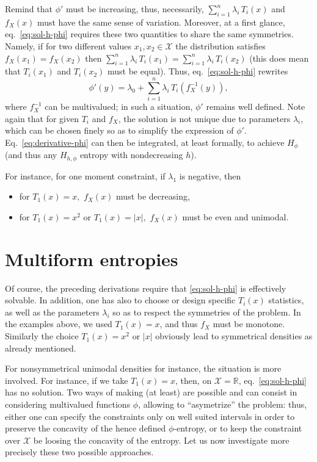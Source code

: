\documentclass[english,onecolumn]{elsarticle}
\def\Rset{\mathbb{R}}
\def\X{\mathcal{X}}
\begin{document}
Remind  that  $\phi'$  must  be increasing,  thus,  necessarily,  $\displaystyle
\sum_{i=1}^n  \lambda_i \,  T_i(x)$ and  $f_X(x)$ must  have the  same  sense of
variation.  Moreover, at a first glance, eq.~\eqref{eq:sol-h-phi} requires these
two  quantities to  share the  same symmetries.   Namely, if  for  two different
values $x_1, x_2  \in \X$ the distribution satisfies  $f_X(x_1) = f_X(x_2)$ then
$\displaystyle \sum_{i=1}^n  \lambda_i \,  T_i(x_1) = \sum_{i=1}^n  \lambda_i \,
T_i(x_2)$ (this does  mean that $T_i(x_1)$ and $T_i(x_2)$  must be equal). Thus,
eq.~\eqref{eq:sol-h-phi} rewrites
%
\begin{equation}
\phi'(y) = \lambda_0 + \sum_{i=1}^n \lambda_i \, T_i \! \left( f_X^{-1}(y)
\right),
\label{eq:derivative-phi}
\end{equation}
%
where $f_X^{-1}$ can  be multivalued; in such a  situation, $\phi'$ remains well
defined. Note again  that for given $T_i$ and $f_X$, the  solution is not unique
due to parameters $\lambda_i$, which can  be chosen finely so as to simplify the
expression of $\phi'$. Eq.~\eqref{eq:derivative-phi}  can then be integrated, at
least  formally, to  achieve $H_\phi$  (and  thus any  $H_{h,\phi}$ entropy  with
nondecreasing $h$).

For instance, for one moment constraint, if $\lambda_1$ is negative, then
%
\begin{itemize}
\item for $T_1(x) = x,$ $f_X(x)$ must be decreasing,
\item for $T_1(x) = x^2$ or $T_1(x) = |x|,$ $f_X(x)$ must be even and unimodal.
\end{itemize}



\section{Multiform entropies}
\label{sec:MultiformEnt}

Of  course,  the preceding  derivations  require  that \eqref{eq:sol-h-phi}  is
effectively solvable.   In addition, one has  also to choose  or design specific
$T_i(x)$ statistics, as well as the  parameters $\lambda_i$ so as to respect the
symmetries of  the problem.  In  the examples above,  we used $T_1(x) =  x$, and
thus $f_X$  must be  monotone.  Similarly  the choice $T_1(x)  = x^2$  or $|x|$
obviously lead to symmetrical densities as already mentioned.

For  nonsymmetrical  unimodal densities  for  instance,  the  situation is  more
involved.   For instance,  if  we take  $T_1(x) =  x$,  then, on  $\X =  \Rset$,
eq.~\eqref{eq:sol-h-phi} has  no solution.   Two ways of  making (at  least) are
possible and  can consist in considering multivalued  functions $\phi$, allowing
to ``asymetrize'' the problem: thus, either one can specify the constraints only
on well suited intervals in order to preserve the concavity of the hence defined
$\phi$-entropy, or to keep the constraint  over $\X$ be loosing the concavity of
the  entropy.  Let  us  now   investigate  more  precisely  these  two  possible
approaches.
\end{document}

